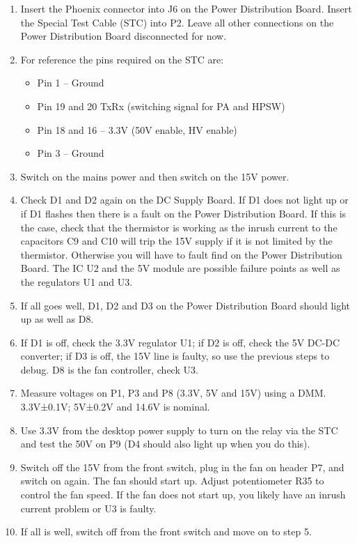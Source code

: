 \begin{enumerate}
	\item Insert the Phoenix connector into J6 on the Power Distribution Board. Insert the Special Test Cable (STC) into P2. Leave all other connections on the Power Distribution Board disconnected for now.
	\item For reference the pins required on the STC are:
		\begin{itemize}
			\item Pin 1 – Ground
			\item Pin 19 and 20 TxRx (switching signal for PA and HPSW)
			\item Pin 18 and 16 – 3.3V (50V enable, HV enable)
			\item Pin 3 – Ground
		\end{itemize}
	\item Switch on the mains power and then switch on the 15V power.
	\item Check D1 and D2 again on the DC Supply Board. If D1 does not light up or if D1 flashes then there is a fault on the Power Distribution Board. If this is the case, check that the thermistor is working as the inrush current to the capacitors C9 and C10 will trip the 15V supply if it is not limited by the thermistor. Otherwise you will have to fault find on the Power Distribution Board. The IC U2 and the 5V module are possible failure points as well as the regulators U1 and U3.
	\item If all goes well, D1, D2 and D3 on the Power Distribution Board should light up as well as D8.
	\item If D1 is off, check the 3.3V regulator U1; if D2 is off, check the 5V DC-DC converter; if D3 is off, the 15V line is faulty, so use the previous steps to debug. D8 is the fan controller, check U3.
	\item Measure voltages on P1, P3 and P8 (3.3V, 5V and 15V) using a DMM. 3.3V±0.1V; 5V±0.2V and 14.6V is nominal.
	\item Use 3.3V from the desktop power supply to turn on the relay via the STC and test the 50V on P9 (D4 should also light up when you do this).
	\item Switch off the 15V from the front switch, plug in the fan on header P7, and switch on again. The fan should start up. Adjust potentiometer R35 to control the fan speed. If the fan does not start up, you likely have an inrush current problem or U3 is faulty.
	\item If all is well, switch off from the front switch and move on to step 5.
\end{enumerate}

